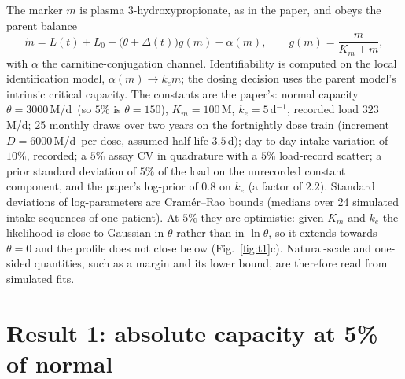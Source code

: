 \documentclass[11pt,a4paper]{article}
\newcommand{\um}{\,\textmu M/d}
\begin{document}
The marker $m$ is plasma 3-hydroxypropionate, as in the paper, and obeys the parent balance
\begin{equation}
\dot m = L(t) + L_0 - \bigl(\theta+\Delta(t)\bigr)g(m) - \alpha(m),\qquad
g(m)=\frac{m}{K_m+m},
\label{eq:parent}
\end{equation}
with $\alpha$ the carnitine-conjugation channel. Identifiability is computed on the local
identification model, $\alpha(m)\to k_e m$; the dosing decision uses the parent model's
intrinsic critical capacity. The constants are the paper's: normal capacity $\theta=3000$\um\
(so $5\%$ is $\theta=150$), $K_m=100$\,\textmu M, $k_e=5$\,d$^{-1}$, recorded load $323$\um;
25 monthly draws over two years on the fortnightly dose train (increment $D=6000$\um\ per
dose, assumed half-life $3.5$\,d); day-to-day intake variation of $10\%$, recorded; a $5\%$
assay CV in quadrature with a $5\%$ load-record scatter; a prior standard deviation of $5\%$
of the load on the unrecorded constant component, and the paper's log-prior of $0.8$ on $k_e$
(a factor of $2.2$). Standard deviations of log-parameters are Cram\'er--Rao bounds (medians
over 24 simulated intake sequences of one patient). At $5\%$ they are optimistic: given $K_m$
and $k_e$ the likelihood is close to Gaussian in $\theta$ rather than in $\ln\theta$, so it
extends towards $\theta=0$ and the profile does not close below (Fig.~\ref{fig:t1}c).
Natural-scale and one-sided quantities, such as a margin and its lower bound, are therefore
read from simulated fits.

\section{Result 1: absolute capacity at 5\% of normal}
\end{document}
